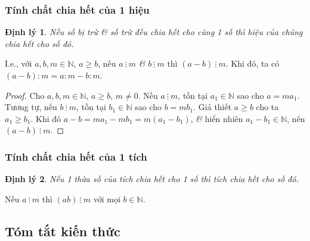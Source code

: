 \documentclass[oneside]{book}
\numberwithin{equation}{section}
\newtheorem{dinhly}{Định lý}[section]
\begin{document}
\subsubsection{Tính chất chia hết của 1 hiệu}
\begin{dinhly}
	Nếu số bị trừ \textit{\&} số trừ đều chia hết cho cùng 1 số thì hiệu của chúng chia hết cho số đó.
\end{dinhly}
I.e., với $a,b,m\in\mathbb{N}$, $a\ge b$, nếu $a\ \vdots\ m$ \textit{\&} $b\ \vdots\ m$ thì $(a - b)\ \vdots\ m$. Khi đó, ta có $(a - b):m = a:m - b:m$.

\begin{proof}[Proof]
	Cho $a,b,m\in\mathbb{N}$, $a\ge b$, $m\ne 0$. Nếu $a\ \vdots\ m$, tồn tại $a_1\in\mathbb{N}$ sao cho $a = ma_1$. Tương tự, nếu $b\ \vdots\ m$, tồn tại $b_1\in\mathbb{N}$ sao cho $b = mb_1$. Giả thiết $a\ge b$ cho ta $a_1\ge b_1$. Khi đó $a - b = ma_1 - mb_1 = m(a_1 - b_1)$, \textit{\&} hiển nhiên $a_1 - b_1\in\mathbb{N}$, nên $(a - b)\ \vdots\ m$.
\end{proof}

\subsubsection{Tính chất chia hết của 1 tích}
\begin{dinhly}
	Nếu 1 thừa số của tích chia hết cho 1 số thì tích chia hết cho số đó.
\end{dinhly}
Nếu $a\ \vdots\ m$  thì $(ab)\ \vdots\ m$ với mọi $b\in\mathbb{N}$.

\subsection{Tóm tắt kiến thức}
\end{document}
